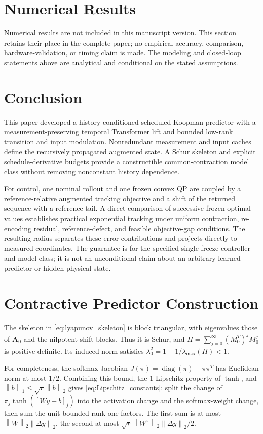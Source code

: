 \documentclass[journal]{IEEEtran}
\newcommand{\mA}{\mathbf{A}}
\newcommand{\norm}[1]{\left\lVert #1\right\rVert}
\begin{document}
\section{Numerical Results}
\label{sec:experiments}
Numerical results are not included in this manuscript version. This section retains their place in the complete paper; no empirical accuracy, comparison, hardware-validation, or timing claim is made. The modeling and closed-loop statements above are analytical and conditional on the stated assumptions.

\section{Conclusion}
\label{sec:conclusion}
This paper developed a history-conditioned scheduled Koopman predictor with a measurement-preserving temporal Transformer lift and bounded low-rank transition and input modulation. Nonredundant measurement and input caches define the recursively propagated augmented state. A Schur skeleton and explicit schedule-derivative budgets provide a constructible common-contraction model class without removing nonconstant history dependence.

For control, one nominal rollout and one frozen convex QP are coupled by a reference-relative augmented tracking objective and a shift of the returned sequence with a reference tail. A direct comparison of successive frozen optimal values establishes practical exponential tracking under uniform contraction, re-encoding residual, reference-defect, and feasible objective-gap conditions. The resulting radius separates these error contributions and projects directly to measured coordinates. The guarantee is for the specified single-freeze controller and model class; it is not an unconditional claim about an arbitrary learned predictor or hidden physical state.

\appendices
\section{Contractive Predictor Construction}
\label{app:construction}
The skeleton in \eqref{eq:lyapunov_skeleton} is block triangular, with eigenvalues those of $\mA_0$ and the nilpotent shift blocks. Thus it is Schur, and $\Pi=\sum_{j=0}^{\infty}(M_0^T)^jM_0^j$ is positive definite. Its induced norm satisfies $\lambda_0^2=1-1/\lambda_{\max}(\Pi)<1$.

For completeness, the softmax Jacobian $J(\pi)=\operatorname{diag}(\pi)-\pi\pi^T$ has Euclidean norm at most $1/2$. Combining this bound, the $1$-Lipschitz property of $\tanh$, and $\norm{b}_1\le\sqrt r\norm{b}_2$ gives \eqref{eq:Lipschitz_constants}: split the change of $\pi_j\tanh([Wy+b]_j)$ into the activation change and the softmax-weight change, then sum the unit-bounded rank-one factors. The first sum is at most $\norm{W}_2\norm{\Delta y}_2$, the second at most $\sqrt r\norm{W^\pi}_2\norm{\Delta y}_2/2$.
\end{document}
